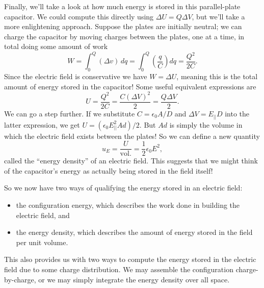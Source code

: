 \documentclass[../p051main.tex]{subfiles}
\begin{document}
Finally, we'll take a look at how much energy is stored in this parallel-plate capacitor.
We could compute this directly using $\Delta U = Q \Delta V$, but we'll take a more enlightening approach.
Suppose the plates are initially neutral; we can charge the capacitor by moving charges between the plates, one at a time, in total doing some amount of work
\[ W = \int_0^Q (\Delta v) \,dq = \int_0^Q \left( \frac{q}{C} \right) dq = \frac{Q^2}{2C}. \]
Since the electric field is conservative we have $W = \Delta U$, meaning this is the total amount of energy stored in the capacitor!
Some useful equivalent expressions are
\[ U = \frac{Q^2}{2C} = \frac{C (\Delta V)^2}{2} = \frac{Q \Delta V}{2}. \]
We can go a step further.
If we substitute $C = \epsilon_0 A / D$ and $\Delta V = E_{||}D$ into the latter expression, we get $U = (\epsilon_0 E_{||}^2 Ad) / 2$.
But $Ad$ is simply the volume in which the electric field exists between the plates!
So we can define a new quantity
\[ u_E = \frac{U}{\textrm{vol.}} = \frac{1}{2} \epsilon_0 E^2, \]
called the ``energy density'' of an electric field.
This suggests that we might think of the capacitor's energy as actually being stored in the field itself!

So we now have two ways of qualifying the energy stored in an electric field:
\begin{itemize}
    \item the configuration energy, which describes the work done in building the electric field, and
    \item the energy density, which describes the amount of energy stored in the field per unit volume.
\end{itemize}
This also provides us with two ways to compute the energy stored in the electric field due to some charge distribution.
We may assemble the configuration charge-by-charge, or we may simply integrate the energy density over all space.
\end{document}

